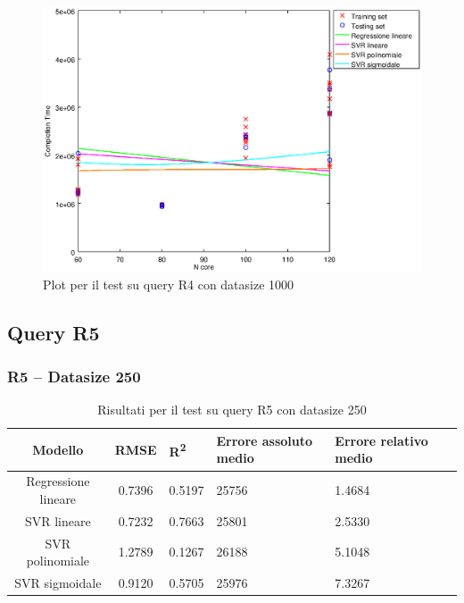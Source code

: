 \documentclass[a4paper,11pt]{article}
\begin{document}
\begin {figure}[hbtp]
\centering
\includegraphics[width=\textwidth]{output/R4_1000/plot_R4_1000.eps}
\caption {Plot per il test su query R4 con datasize 1000}
\end {figure}

\newpage
\subsection{Query R5}

\subsubsection{R5 -- Datasize 250}
\begin{table}[bhpt]
	\centering
	\begin{adjustbox}{center}
		\begin{tabular}{c | c M{1cm} M{2.5cm} M{2.5cm} M{1.8cm}}
			Modello & RMSE & R\textsuperscript{2} & Errore assoluto medio & Errore relativo medio \tabularnewline
			\hline
			Regressione lineare & 0.7396 & 0.5197 &  25756 & 1.4684 \\
			SVR lineare & 0.7232 & 0.7663 &  25801 & 2.5330 \\
			SVR polinomiale & 1.2789 & 0.1267 &  26188 & 5.1048 \\
			SVR sigmoidale & 0.9120 & 0.5705 &  25976 & 7.3267 \\
		\end{tabular}
	\end{adjustbox}
	\\
	\caption{Risultati per il test su query R5 con datasize 250}
	\label{table_R5_250}
\end{table}
\end{document}
